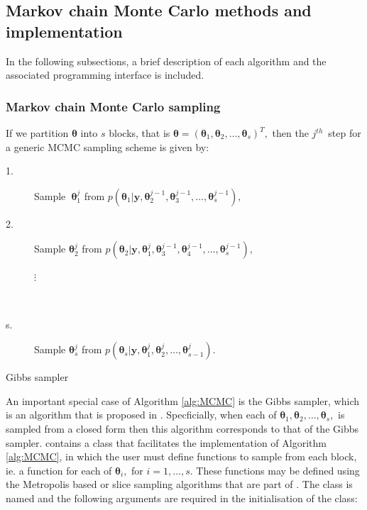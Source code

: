 \documentclass[article]{jss}
\begin{document}
\subsection{Markov chain Monte Carlo methods and implementation}

In the following subsections, a brief description of each algorithm
and the associated programming interface is included.


\subsubsection{Markov chain Monte Carlo sampling}

If we partition $\bm{\theta}$ into $s$ blocks, that is
$\bm{\bm{\theta}}=\left(\bm{\theta}_{1},\bm{\theta}_{2},\ldots,\bm{\theta}_{s}\right)^{T},$
then the $j^{th}$\ step for a generic MCMC sampling scheme is given
by:

%
\begin{algorithm}[H]
\begin{description}
\item [{\textmd{1.}}] Sample\textbf{\ }$\bm{\theta}_{1}^{j}$ from $p\left(\bm{\theta}_{1}|\bm{y,}\bm{\theta}_{2}^{j-1},\bm{\theta}_{3}^{j-1},\ldots,\bm{\theta}_{s}^{j-1}\right),$ 
\item [{\textmd{2.}}] Sample $\bm{\theta}_{2}^{j}$ from $p\left(\bm{\theta}_{2}|\bm{y,}\bm{\theta}_{1}^{j},\bm{\theta}_{3}^{j-1},\bm{\theta}_{4}^{j-1},\ldots,\bm{\theta}_{s}^{j-1}\right),$

\begin{description}
\item [{$\vdots$}]~
\end{description}
\item [{\textmd{s.}}] Sample $\bm{\theta}_{s}^{j}$ from $p\left(\bm{\theta}_{s}|\bm{y,}\bm{\theta}_{1}^{j},\bm{\theta}_{2}^{j},\ldots,\bm{\theta}_{s-1}^{j}\right).$ 
\end{description}
\caption{Gibbs sampler}
\label{alg:MCMC}
\end{algorithm}

An important special case of Algorithm \ref{alg:MCMC} is the Gibbs
sampler, which is an algorithm that is proposed in
\citet{GelfandSmith1990}. Specficially, when each of
$\bm{\theta}_{1},\bm{\theta}_{2},\dots,\bm{\theta}_{s},$ is sampled
from a closed form then this algorithm corresponds to that of the
Gibbs sampler.  contains a class that facilitates the
implementation of Algorithm \ref{alg:MCMC}, in which the user must
define functions to sample from each block, ie. a function for each of
$\bm{\theta}_{i},$ for $i=1,\dots,s.$ These functions may be defined
using the Metropolis based or slice sampling algorithms that are part
of . The class is named  and the following
arguments are required in the initialisation of the class:
\end{document}
